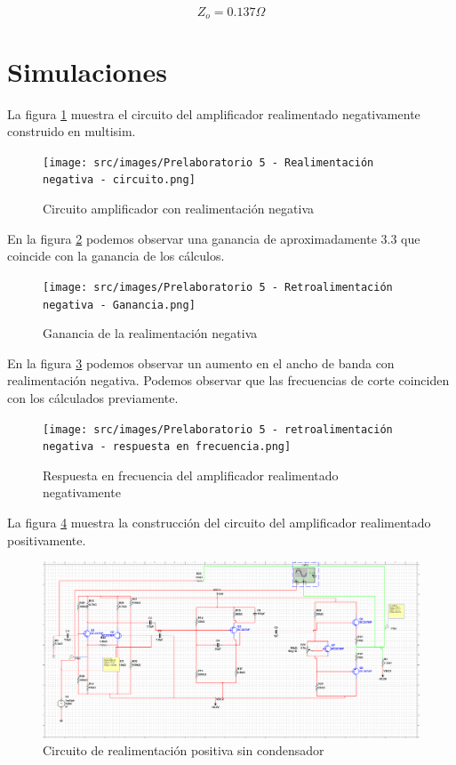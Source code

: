 \documentclass{article}
\begin{document}
$$Z_o = 0.137 \Omega$$

\section{Simulaciones}

La figura \ref{fig:amplificador-realimentado-negativo} muestra el circuito del amplificador realimentado negativamente construido en multisim.

\begin{figure}[ht]
    \centering
    \texttt{[image: src/images/Prelaboratorio 5 - Realimentación negativa - circuito.png]}
    \caption{Circuito amplificador con realimentación negativa}
    \label{fig:amplificador-realimentado-negativo}
\end{figure}

En la figura \ref{fig:ganancia-realimentacion-negativa} podemos observar una ganancia de aproximadamente $3.3$ que coincide con la ganancia de los cálculos.

\begin{figure}[ht]
    \centering
    \texttt{[image: src/images/Prelaboratorio 5 - Retroalimentación negativa - Ganancia.png]}
    \caption{Ganancia de la realimentación negativa}
    \label{fig:ganancia-realimentacion-negativa}
\end{figure}

En la figura \ref{fig:respuesta-frecuencia-realimentacion-negativa} podemos observar un aumento en el ancho de banda con realimentación negativa. Podemos observar que las frecuencias de corte coinciden con los cálculados previamente.

\begin{figure}[ht]
    \centering
    \texttt{[image: src/images/Prelaboratorio 5 - retroalimentación negativa - respuesta en frecuencia.png]}
    \caption{Respuesta en frecuencia del amplificador realimentado negativamente}
    \label{fig:respuesta-frecuencia-realimentacion-negativa}
\end{figure}


La figura \ref{fig:circuito-realimentacion-positiva-sin-condensador} muestra la construcción del circuito del amplificador realimentado positivamente.

\begin{figure}[ht]
    \centering
    \includegraphics[width=\textwidth]{src/images/Prelaboratorio 5 - Realimentacion positiva sin condensador - circuito.png}
    \caption{Circuito de realimentación positiva sin condensador}
    \label{fig:circuito-realimentacion-positiva-sin-condensador}
\end{figure}
\end{document}
